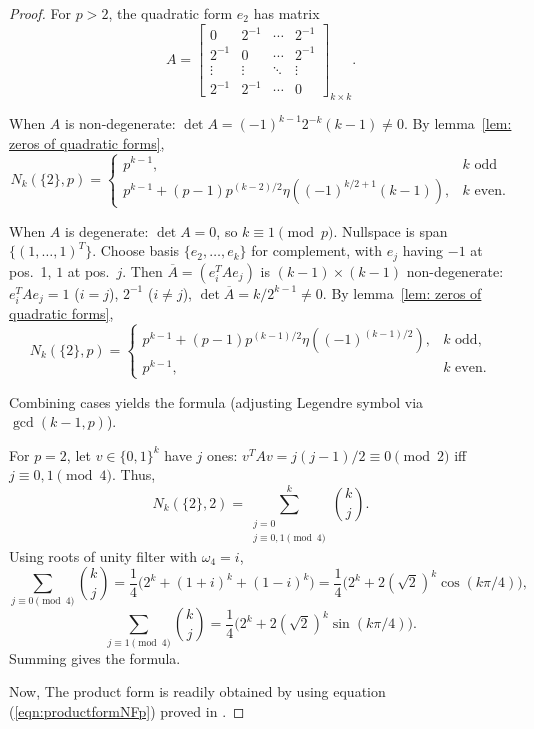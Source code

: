 \documentclass[12pt]{article}
\begin{document}
\begin{proof}
For $p>2$, the quadratic form $e_2$ has matrix
$$
A= \begin{bmatrix}
0 &2^{-1} &\cdots &2^{-1}\\
2^{-1} & 0 & \cdots &2^{-1}\\
\vdots & \vdots & \ddots & \vdots\\
2^{-1} & 2^{-1} & \cdots & 0
\end{bmatrix}_{k\times k}.
$$

When $A$ is non-degenerate: $\det A=(-1)^{k-1}2^{-k}(k-1)\neq0$. By lemma~\ref{lem: zeros of quadratic forms},
$$
N_k(\{2\}, p)=\begin{cases}
p^{k-1}, &k\text{ odd}\\
p^{k-1}+(p-1)p^{(k-2)/2}\eta((-1)^{k/2+1}(k-1)), &k\text{ even}.
\end{cases}
$$

When $A$ is degenerate: $\det A=0$, so $k\equiv1\pmod{p}$. Nullspace is span$\{(1,\dots,1)^T\}$. Choose basis $\{e_2,\dots,e_k\}$ for complement, with $e_j$ having $-1$ at pos.~1, $1$ at pos.~$j$. Then $\overline{A}=(e_i^TAe_j)$ is $(k-1)\times(k-1)$ non-degenerate: $e_i^TAe_j=1$ ($i=j$), $2^{-1}$ ($i\neq j$), $\det\overline{A}=k/2^{k-1}\neq0$. By lemma~\ref{lem: zeros of quadratic forms},
$$
N_k(\{2\},p)=\begin{cases}
p^{k-1}+(p-1)p^{(k-1)/2}\eta((-1)^{(k-1)/2}), &k\text{ odd},\\
p^{k-1}, &k\text{ even}.
\end{cases}
$$

Combining cases yields the formula (adjusting Legendre symbol via $\gcd(k-1,p)$).

For $p=2$, let $v\in\{0,1\}^k$ have $j$ ones: $v^TA v=j(j-1)/2\equiv0\pmod{2}$ iff $j\equiv0,1\pmod{4}$. Thus,
$$
N_k(\{2\},2)=\sum_{\substack{j=0\\j\equiv0,1\pmod{4}}}^k\binom{k}{j}.
$$
Using roots of unity filter with $\omega_4=i$,
$$
\sum_{j\equiv0\pmod{4}}\binom{k}{j}=\frac{1}{4}\bigl(2^k+(1+i)^k+(1-i)^k\bigr)=\frac{1}{4}\bigl(2^k+2(\sqrt{2})^k\cos(k\pi/4)\bigr),
$$
$$
\sum_{j\equiv1\pmod{4}}\binom{k}{j}=\frac{1}{4}\bigl(2^k+2(\sqrt{2})^k\sin(k\pi/4)\bigr).
$$
Summing gives the formula.

Now, The product form is readily obtained by using equation (\ref{eqn:productformNFp}) proved in \cite[Theorem 2.1]{csizmazia2025generalizationseulersvarphifunctionrespect}.
\end{proof}
\end{document}
